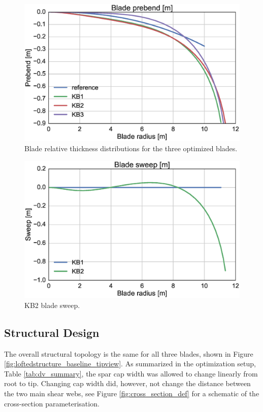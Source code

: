 \begin{figure}[!ht]
\begin{center}
	\includegraphics[width=.85\linewidth]{figures/KB_prebend.eps}
\end{center}
\caption{Blade relative thickness distributions for the three optimized blades.}
\label{fig:prebend}
\end{figure}

\begin{figure}[!ht]
\begin{center}
	\includegraphics[width=.85\linewidth]{figures/KB_sweep.eps}
\end{center}
\caption{KB2 blade sweep.}
\label{fig:sweep}
\end{figure}

\subsection{Structural Design}

The overall structural topology is the same for all three blades, shown in Figure \ref{fig:loftedstructure_baseline_tipview}.
As summarized in the optimization setup, Table \ref{tab:dv_summary}, the spar cap width was allowed to change linearly from root to tip.
Changing cap width did, however, not change the distance between the two main shear webs, see Figure \ref{fig:cross_section_def} for a schematic of the cross-section parameterisation.


